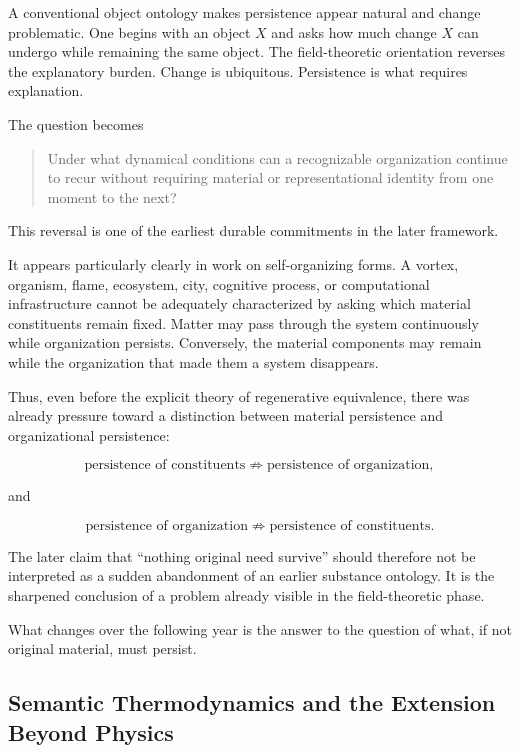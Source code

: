 \documentclass[11pt]{article}
\theoremstyle{remark}
\begin{document}
A conventional object ontology makes persistence appear natural and change problematic. One begins with an object $X$ and asks how much change $X$ can undergo while remaining the same object. The field-theoretic orientation reverses the explanatory burden. Change is ubiquitous. Persistence is what requires explanation.

The question becomes

\begin{quote}
Under what dynamical conditions can a recognizable organization continue to recur without requiring material or representational identity from one moment to the next?
\end{quote}

This reversal is one of the earliest durable commitments in the later framework.

It appears particularly clearly in work on self-organizing forms. A vortex, organism, flame, ecosystem, city, cognitive process, or computational infrastructure cannot be adequately characterized by asking which material constituents remain fixed. Matter may pass through the system continuously while organization persists. Conversely, the material components may remain while the organization that made them a system disappears.

Thus, even before the explicit theory of regenerative equivalence, there was already pressure toward a distinction between material persistence and organizational persistence:

\begin{equation}
\text{persistence of constituents}
\not\Rightarrow
\text{persistence of organization},
\end{equation}

and

\begin{equation}
\text{persistence of organization}
\not\Rightarrow
\text{persistence of constituents}.
\end{equation}

The later claim that ``nothing original need survive'' should therefore not be interpreted as a sudden abandonment of an earlier substance ontology. It is the sharpened conclusion of a problem already visible in the field-theoretic phase.

What changes over the following year is the answer to the question of what, if not original material, must persist.

\subsection{Semantic Thermodynamics and the Extension Beyond Physics}
\end{document}

